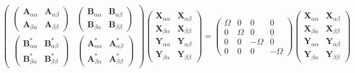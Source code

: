 \documentclass[12pt]{article}
\begin{document}
\begin{equation}
    \begin{pmatrix}
\begin{pmatrix}
    \mathbf{A}_{\alpha \alpha } & \mathbf{A}_{\alpha \beta } \\
    \mathbf{A}_{\beta \alpha } & \mathbf{A}_{\beta \beta }
\end{pmatrix}
&
\begin{pmatrix}
    \mathbf{B}_{\alpha \alpha } & \mathbf{B}_{\alpha \beta } \\
    \mathbf{B}_{\beta \alpha } & \mathbf{B}_{\beta \beta }
\end{pmatrix}
\\
\begin{pmatrix}
    \mathbf{B}_{\alpha \alpha }^{*} & \mathbf{B}_{\alpha \beta }^{*} \\
    \mathbf{B}_{\beta \alpha }^{*} & \mathbf{B}_{\beta \beta }^{*}
\end{pmatrix}
&
\begin{pmatrix}
    \mathbf{A}_{\alpha \alpha }^{*} & \mathbf{A}_{\alpha \beta }^{*} \\
    \mathbf{A}_{\beta \alpha }^{*} & \mathbf{A}_{\beta \beta }^{*}
\end{pmatrix}
\end{pmatrix}
    \begin{pmatrix}
        \mathbf{X}_{\alpha\alpha} & \mathbf{X}_{\alpha\beta}\\
        \mathbf{X}_{\beta\alpha} & \mathbf{X}_{\beta\beta}\\
        \mathbf{Y}_{\alpha\alpha} & \mathbf{Y}_{\alpha\beta}\\
        \mathbf{Y}_{\beta\alpha} & \mathbf{Y}_{\beta\beta}
    \end{pmatrix}
    =
    \begin{pmatrix}
        \Omega & 0 & 0 & 0\\
        0 & \Omega & 0 & 0\\
        0 & 0 & -\Omega & 0\\
        0 & 0 & 0 & -\Omega
    \end{pmatrix}
    \begin{pmatrix}
        \mathbf{X}_{\alpha\alpha} & \mathbf{X}_{\alpha\beta}\\
        \mathbf{X}_{\beta\alpha} & \mathbf{X}_{\beta\beta}\\
        \mathbf{Y}_{\alpha\alpha} & \mathbf{Y}_{\alpha\beta}\\
        \mathbf{Y}_{\beta\alpha} & \mathbf{Y}_{\beta\beta}
    \end{pmatrix}
\end{equation}
\end{document}
